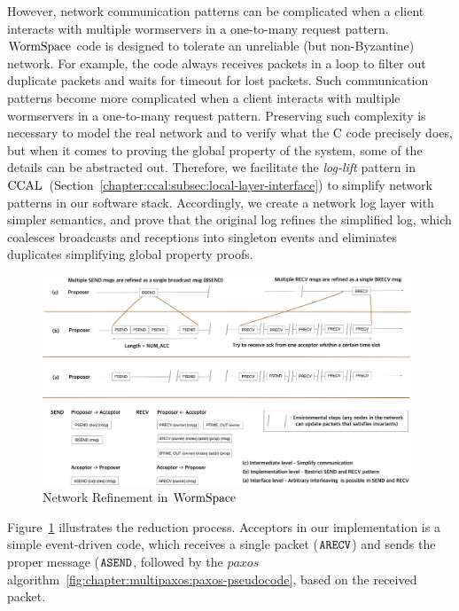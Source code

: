 However, network communication patterns can be complicated when a client interacts with multiple wormservers in a one-to-many request pattern.
$\mathrm{WormSpace}$ code is designed to tolerate an unreliable (but non-Byzantine) network. 
For example, the code always receives packets in a loop to filter out duplicate packets and waits for timeout for lost packets. 
Such communication patterns become more complicated when a client interacts with multiple wormservers in a one-to-many request pattern.
Preserving such complexity is necessary to model the real network and to verify what the C code precisely does,
but when it comes to proving the global property of the system, some of the details can be abstracted out.
Therefore, we facilitate the  \textit{log-lift} pattern in $\mathrm{CCAL}$~(Section~\ref{chapter:ccal:subsec:local-layer-interface}) 
to simplify network patterns in our software stack. 
Accordingly, we create a network log layer with simpler semantics, and prove that the original log refines the simplified log, 
which coalesces broadcasts and receptions into singleton events and eliminates duplicates simplifying global property proofs.
\begin{figure}
\begin{center}
\includegraphics[width=0.98\textwidth]{figs/multipaxos/wormspace_network_refine}
\end{center}
\caption{Network Refinement in $\mathrm{WormSpace}$}
\label{fig:chapter:multipaxos:network-refinement}
\end{figure}
Figure~\ref{fig:chapter:multipaxos:network-refinement} illustrates the reduction process.
Acceptors in our implementation is a simple event-driven code, which receives a single packet (${\mathrm{\texttt{ARECV}}}$) and 
sends the proper message (${\mathrm{\texttt{ASEND}}}$, followed by the $paxos$ algorithm~\ref{fig:chapter:multipaxos:paxos-pseudocode}, 
based on the received packet.
